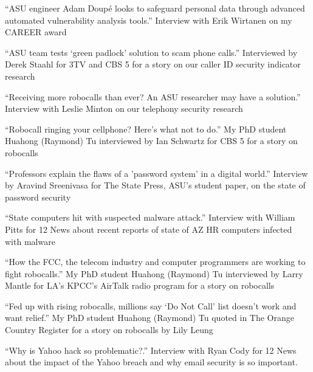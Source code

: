 \documentclass[11pt,letterpaper,sans]{moderncv}
\begin{document}


 {``ASU engineer Adam Doup\'e looks to
  safeguard personal data through advanced automated vulnerability
  analysis tools.'' Interview with Erik Wirtanen on my CAREER award} 

 {``ASU team tests `green padlock' solution to
  scam phone calls.'' Interviewed by Derek Staahl for 3TV and CBS 5
  for a story on our caller ID security indicator research}

 {``Receiving more robocalls than ever? An ASU
  researcher may have a solution.'' Interview with Leslie Minton on our
  telephony security research}

 {``Robocall ringing your cellphone? Here's
  what not to do.'' My PhD student Huahong (Raymond) Tu interviewed by
  Ian Schwartz for CBS 5 for a story on robocalls}

 {``Professors explain the flaws of a
  'password system' in a digital world.'' Interview by Aravind
  Sreenivasa for The State Press, ASU's student paper, on the state of
  password security}

 {``State computers hit with suspected
  malware attack.'' Interview with William Pitts for 12 News about
  recent reports of state of AZ HR computers infected with malware}

 {``How the FCC, the telecom industry and
  computer programmers are working to fight robocalls.'' My PhD
  student Huahong (Raymond) Tu interviewed by Larry Mantle for LA’s KPCC’s AirTalk radio program for a story on robocalls}

 {``Fed up with rising robocalls, millions
  say ‘Do Not Call’ list doesn’t work and want relief.'' My PhD
  student Huahong (Raymond) Tu quoted in The Orange Country Register for a story on robocalls by Lily Leung}

 {``Why is Yahoo hack so problematic?.'' Interview with Ryan Cody for 12 News about the impact of the Yahoo breach and why email security is so important.}
\end{document}
